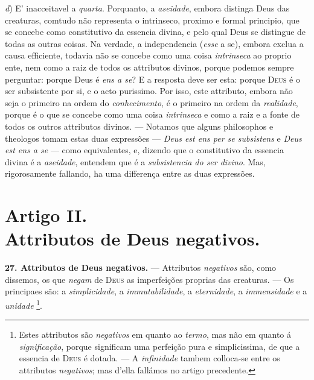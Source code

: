 \emph{d}) E' inacceitavel a \emph{quarta}. Porquanto, a \emph{aseidade}, embora distinga Deus das creaturas, comtudo não representa o intrinseco, proximo e formal principio, que se concebe como constitutivo da essencia divina, e pelo qual Deus se distingue de todas as outras coisas. Na verdade, a independencia (\emph{esse} a se), embora exclua a causa efficiente, todavia não se concebe como uma coisa \emph{intrinseca} ao proprio ente, nem como a raiz de todos os attributos divinos, porque podemos sempre perguntar: porque Deus é \emph{ens a se}? E a resposta deve ser esta: porque \textsc{Deus} é o ser subsistente por si, e o acto purissimo. Por isso, este attributo, embora não seja o primeiro na ordem do \emph{conhecimento}, é o primeiro na ordem da \emph{realidade}, porque é o que se concebe como uma coisa \emph{intrinseca} e como a raiz e a fonte de todos os outros attributos divinos. --- Notamos que alguns philosophos e theologos tomam estas duas expressões --- \emph{Deus est ens per se subsistens} e \emph{Deus est ens a se} --- como equivalentes, e, dizendo que o constitutivo da essencia divina é a \emph{aseidade}, entendem que é a \emph{subsistencia do ser divino}. Mas, rigorosamente fallando, ha uma differença entre as duas expressões.


\section*{Artigo II.\\ Attributos de Deus negativos.}

 \textbf{27. Attributos de Deus negativos.} --- Attributos \emph{negativos} são, como dissemos, os que \emph{negam} de \textsc{Deus} as imperfeições proprias das creaturas. --- Os principaes são: a \emph{simplicidade}, a \emph{immutabilidade}, a \emph{eternidade}, a \emph{immensidade} e a \emph{unidade} \footnote{Estes attributos são \emph{negativos} em quanto ao \emph{termo}, mas não em quanto á \emph{significação}, porque significam uma perfeição pura e simplicissima, de que a essencia de \textsc{Deus} é dotada. --- A \emph{infinidade} tambem colloca-se entre os attributos \emph{negativos}; mas d'ella fallámos no artigo precedente.}.

